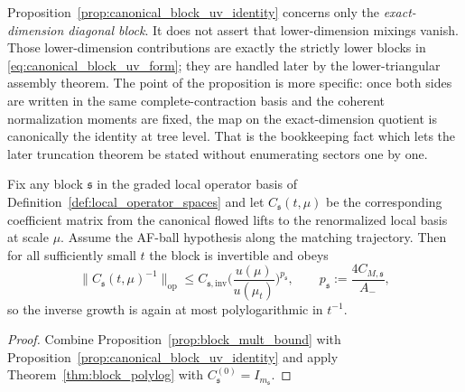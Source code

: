 \begin{remark}\label{rem:canonical_block_uv_scope}
Proposition~\ref{prop:canonical_block_uv_identity} concerns only the \emph{exact-dimension diagonal block}.
It does not assert that lower-dimension mixings vanish.
Those lower-dimension contributions are exactly the strictly lower blocks in \eqref{eq:canonical_block_uv_form};
they are handled later by the lower-triangular assembly theorem.
The point of the proposition is more specific:
once both sides are written in the same complete-contraction basis and the coherent normalization moments are fixed,
the map on the exact-dimension quotient is canonically the identity at tree level.
That is the bookkeeping fact which lets the later truncation theorem be stated without enumerating sectors one by one.
\end{remark}

\begin{theorem}\label{thm:canonical_block_polylog}
Fix any block $\mathfrak s$ in the graded local operator basis of Definition~\ref{def:local_operator_spaces} and let
$C_{\mathfrak s}(t,\mu)$ be the corresponding coefficient matrix from the canonical flowed lifts to the renormalized local basis at scale $\mu$.
Assume the AF-ball hypothesis along the matching trajectory.
Then for all sufficiently small $t$ the block is invertible and obeys
\begin{equation}\label{eq:canonical_block_polylog}
\|C_{\mathfrak s}(t,\mu)^{-1}\|_{\mathrm{op}}
\le
C_{\mathfrak s,\mathrm{inv}}
\Big(\frac{u(\mu)}{u(\mu_t)}\Big)^{p_{\mathfrak s}},
\qquad
p_{\mathfrak s}:=\frac{4C_{M,\mathfrak s}}{A_-},
\end{equation}
so the inverse growth is again at most polylogarithmic in $t^{-1}$.
\end{theorem}

\begin{proof}
Combine Proposition~\ref{prop:block_mult_bound} with Proposition~\ref{prop:canonical_block_uv_identity} and apply Theorem~\ref{thm:block_polylog} with $C_{\mathfrak s}^{(0)}=I_{m_{\mathfrak s}}$.
\end{proof}

